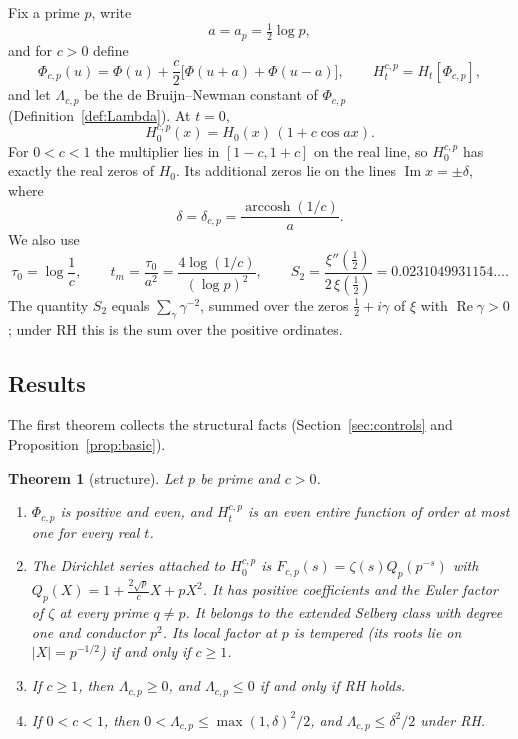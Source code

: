 \documentclass[11pt]{article}
\numberwithin{equation}{section}
\newtheorem{theorem}{Theorem}[section]
\theoremstyle{definition}
\theoremstyle{remark}
\DeclareMathOperator{\Rea}{Re}
\DeclareMathOperator{\Ima}{Im}
\DeclareMathOperator{\arccosh}{arccosh}
\begin{document}
Fix a prime $p$, write
\begin{equation}\label{eq:a}
a=a_p=\tfrac12\log p,
\end{equation}
and for $c>0$ define
\begin{equation}\label{eq:control}
\Phi_{c,p}(u)=\Phi(u)+\frac c2\bigl[\Phi(u+a)+\Phi(u-a)\bigr],\qquad
H^{c,p}_t=H_t[\Phi_{c,p}],
\end{equation}
and let $\Lambda_{c,p}$ be the de Bruijn--Newman constant of
$\Phi_{c,p}$ (Definition~\ref{def:Lambda}). At $t=0$,
\begin{equation}\label{eq:t0}
H^{c,p}_0(x)=H_0(x)\,(1+c\cos ax).
\end{equation}
For $0<c<1$ the multiplier lies in $[1-c,1+c]$ on the real line, so
$H^{c,p}_0$ has exactly the real zeros of $H_0$. Its additional zeros lie
on the lines $\Ima x=\pm\delta$, where
\begin{equation}\label{eq:delta}
\delta=\delta_{c,p}=\frac{\arccosh(1/c)}{a}.
\end{equation}
We also use
\begin{equation}\label{eq:tm}
\tau_0=\log\frac1c,\qquad
t_m=\frac{\tau_0}{a^2}=\frac{4\log(1/c)}{(\log p)^2},\qquad
S_2=\frac{\xi''(\tfrac12)}{2\,\xi(\tfrac12)}=0.0231049931154\ldots .
\end{equation}
The quantity $S_2$ equals $\sum_{\gamma}\gamma^{-2}$, summed over the zeros
$\tfrac12+i\gamma$ of $\xi$ with $\Rea\gamma>0$; under RH this is the sum
over the positive ordinates.

\subsection{Results}
The first theorem collects the structural facts (Section~\ref{sec:controls}
and Proposition~\ref{prop:basic}).

\begin{theorem}[structure]\label{thm:structure}
Let $p$ be prime and $c>0$.
\begin{enumerate}[label=\textup{(\alph*)}]
\item $\Phi_{c,p}$ is positive and even, and $H^{c,p}_t$ is an even entire
function of order at most one for every real $t$.
\item The Dirichlet series attached to $H^{c,p}_0$ is
$F_{c,p}(s)=\zeta(s)Q_p(p^{-s})$ with
$Q_p(X)=1+\tfrac{2\sqrt p}{c}X+pX^2$. It has positive coefficients and the
Euler factor of $\zeta$ at every prime $q\ne p$. It belongs to the extended
Selberg class with degree one and conductor $p^2$. Its local factor at $p$
is tempered (its roots lie on $|X|=p^{-1/2}$) if and only if $c\ge1$.
\item If $c\ge1$, then $\Lambda_{c,p}\ge0$, and $\Lambda_{c,p}\le0$ if and
only if RH holds.
\item If $0<c<1$, then $0<\Lambda_{c,p}\le\max(1,\delta)^2/2$, and
$\Lambda_{c,p}\le\delta^2/2$ under RH.
\end{enumerate}
\end{theorem}
\end{document}
